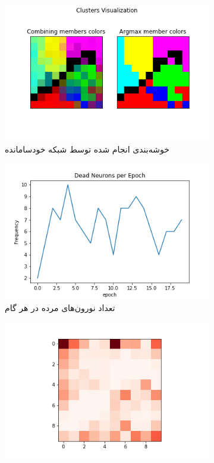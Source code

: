 \documentclass[12pt, a4paper]{article}
\begin{document}
\begin{figure}[h]
    \begin{subfigure}{\linewidth}
        \centering
        \includegraphics[width=0.8\linewidth]{images/q5/r10/cluster.png}
        \caption{خوشه‌بندی انجام شده توسط شبکه خودسامانده}
    \end{subfigure}
    \newline
    \begin{subfigure}{0.45\linewidth}
        \includegraphics[width=\linewidth]{images/q5/r10/dead.png}
        \caption{تعداد نورون‌های مرده در هر گام}
    \end{subfigure}
    \hfill
    \begin{subfigure}{0.45\linewidth}
        \includegraphics[width=\linewidth]{images/q5/r10/umatrix.png}

\end{subfigure}
\end{figure}
\end{document}
